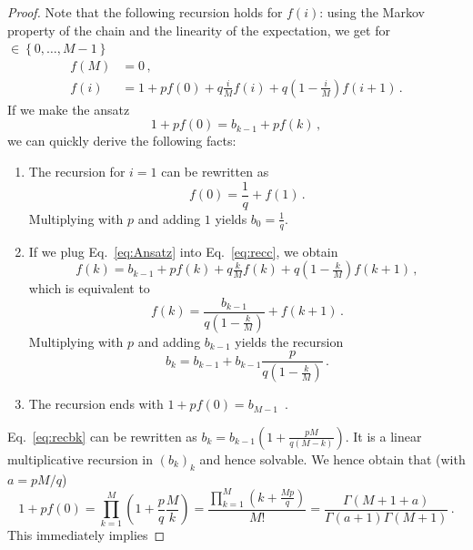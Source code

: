 \documentclass{article}
\numberwithin{equation}{section}
\newcommand{\gk}[1]{\left\{#1\right\}}
\newcommand{\rk}[1]{\left(#1\right)}
\newcommand{\1}{\mathbbm{1}}
\begin{document}
\begin{proof}
Note that the following recursion holds for $f(i)$: using the Markov property of the chain and the linearity of the expectation, we get for $\in \gk{0,\ldots, M-1}$
    \begin{equation}\label{eq:recc}
\begin{split}
    f(M)&=0\, ,\\
    f(i)&=1+pf(0)+q\tfrac{i}{M}f(i)+q\rk{1-\tfrac{i}{M}}f(i+1)\, .
\end{split}
\end{equation}
If we make the ansatz
\begin{equation}\label{eq:Ansatz}
    1+pf(0)=b_{k-1}+pf(k)\, ,
\end{equation}
we can quickly derive the following facts:
\begin{enumerate}
    \item The recursion for $i=1$ can be rewritten as 
    \begin{equation}
        f(0)=\frac{1}{q}+f(1)\, .
    \end{equation}
    Multiplying with $p$ and adding $1$ yields $b_0=\frac{1}{q}$.
    \item If we plug Eq.~\eqref{eq:Ansatz} into Eq.~\eqref{eq:recc}, we obtain
    \begin{equation}
        f(k)=b_{k-1}+pf(k)+q\tfrac{k}{M}f(k)+q\rk{1-\tfrac{k}{M}}f(k+1)\, ,
    \end{equation}
    which is equivalent to
    \begin{equation}
        f(k)=\frac{b_{k-1}}{q\rk{1-\tfrac{k}{M}}}+f(k+1)\, .
    \end{equation}
    Multiplying with $p$ and adding $b_{k-1}$ yields the recursion
    \begin{equation}\label{eq:recbk}
        b_{k}=b_{k-1}+b_{k-1}\frac{p}{q\rk{1-\tfrac{k}{M}}}\, .
    \end{equation}
    \item The recursion ends with $1+pf(0)=b_{M-1}$\, .
\end{enumerate}
Eq.~\eqref{eq:recbk} can be rewritten as $b_{k}=b_{k-1}\rk{1+\tfrac{pM}{q(M-k)}}$. It is a linear multiplicative recursion in $(b_k)_k$ and hence solvable. We hence obtain that (with $a=pM/q$)
\begin{equation}\label{eq:valofhelp}
    1+pf(0)=\prod_{k=1}^M\rk{1+\frac{p}{q}\frac{M}{k}}=\frac{\prod_{k=1}^M\rk{k+\tfrac{Mp}{q}}}{M!}=\frac{\Gamma\rk{M+1+a}}{\Gamma(a+1)\Gamma(M+1)}\, .
\end{equation}
This immediately implies

\end{proof}
\end{document}
